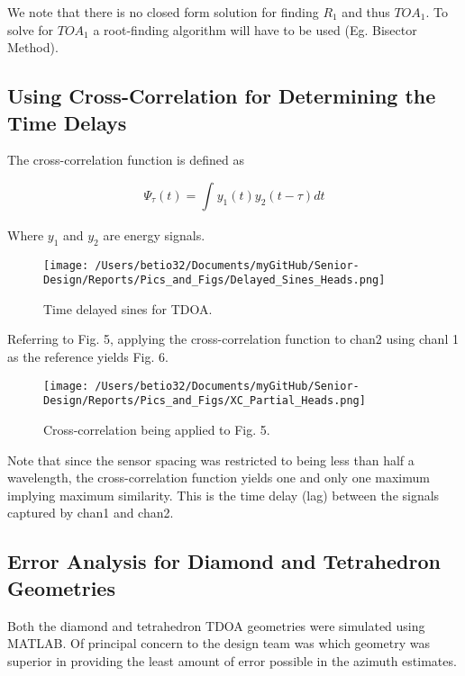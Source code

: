 \documentclass[12pt]{article}
\begin{document}
\noindent We note that there is no closed form solution for finding $R_1$ and thus $TOA_1$. To solve for $TOA_1$ a root-finding algorithm will have to be used (Eg. Bisector Method).

\subsection{Using Cross-Correlation for Determining the Time Delays}

\vspace{5 mm}
\noindent The cross-correlation function is defined as
\begin{center}
\begin{equation} \label{eq:29}
\Psi_\tau (t) = \int_{}^{} y_1(t) y_2(t-\tau) dt
\end{equation}
\end{center}

\vspace{5 mm}
\noindent Where $y_1$ and $y_2$ are energy signals.

\begin{figure}[!h]
	\centering
	\texttt{[image: /Users/betio32/Documents/myGitHub/Senior-Design/Reports/Pics\_and\_Figs/Delayed\_Sines\_Heads.png]}
    \caption{Time delayed sines for TDOA.} \label{fig:Delayed_Sines_Heads}
\end{figure}

\pagebreak
\noindent Referring to Fig. 5, applying the cross-correlation function to chan2 using chanl 1 as the reference yields Fig. 6.

\begin{figure}[!h]
	\centering
	\texttt{[image: /Users/betio32/Documents/myGitHub/Senior-Design/Reports/Pics\_and\_Figs/XC\_Partial\_Heads.png]}
    \caption{Cross-correlation being applied to Fig. 5.} \label{fig:XC_Partial_Heads}
\end{figure}

\noindent Note that since the sensor spacing was restricted to being less than half a wavelength, the cross-correlation function yields one and only one maximum implying maximum similarity. This is the time delay (lag) between the signals captured by chan1 and chan2.

\subsection{Error Analysis for Diamond and Tetrahedron Geometries}

\noindent Both the diamond and tetrahedron TDOA geometries were simulated using MATLAB. Of principal concern to the design team was which geometry was superior in providing the least amount of error possible in the azimuth estimates.\\
\end{document}
